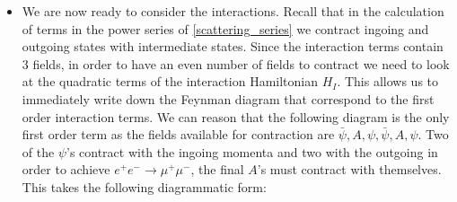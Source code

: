 \documentclass[11pt]{article}
\numberwithin{equation}{section}
\begin{document}
\begin{itemize}
\item We are now ready to consider the interactions. Recall that in the calculation of terms in the power series of \ref{scattering_series} we contract ingoing and outgoing states with intermediate states. Since the interaction terms contain 3 fields, in order to have an even number of fields to contract we need to look at the quadratic terms of the interaction Hamiltonian $H_{I}$. This allows us to immediately write down the Feynman diagram that correspond to the first order interaction terms. We can reason that the following diagram is the only first order term as the fields available for contraction are $\bar{\psi},A,\psi,\bar{\psi},A,\psi$. Two of the $\psi$'s contract with the ingoing momenta and two with the outgoing in order to achieve $e^+e^- \rightarrow \mu^+\mu^-$, the final $A$'s must contract with themselves. This takes the following diagrammatic form: 
\begin{figure}[H]
\centering
\end{figure}
\end{itemize}
\end{document}
